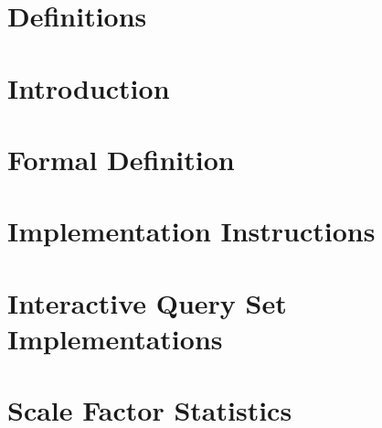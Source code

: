 \documentclass{ldbc}
\author{[Arnau Prat (UPC)]}
\begin{document}
\maketitle

%

\listoffigures
\listoftables
\chapter*{Definitions}


\chapter{Introduction}


\chapter{Formal Definition}


\chapter{Implementation Instructions}\label{chapter:instructions}





\appendix

\chapter{Interactive Query Set Implementations}


\chapter{Scale Factor Statistics}

\end{document}
